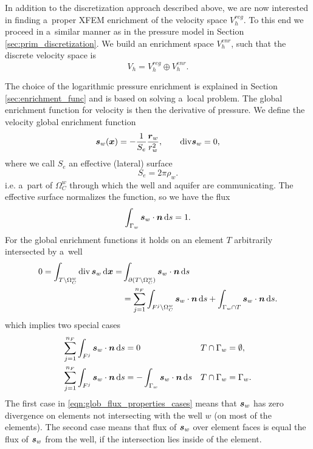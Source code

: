 In addition to the discretization approach described above, we are now interested in finding
a~proper XFEM enrichment of the velocity space $V^{reg}_h$.
To this end we proceed in a~similar manner as in the pressure model in Section \ref{sec:prim_discretization}.
We build an enrichment space $V_h^{enr}$, such that the discrete velocity space is
\begin{equation}
    V_h = V_h^{reg} \oplus V_h^{enr}.
\end{equation}

The choice of the logarithmic pressure enrichment is explained in Section \ref{sec:enrichment_func} and
is based on solving a~local problem. The global enrichment function for velocity is then 
the derivative of pressure. We define the velocity global enrichment function
\begin{equation}
    \mathbf{\boldsymbol{s}}_w(\mathbf{\boldsymbol{x}}) = -\frac{1}{S_e} \frac{\mathbf{\boldsymbol{r}}_w}{r_w^2}, \qquad {\rm div} \mathbf{\boldsymbol{s}}_w = 0 \label{eqn:global_enr_vel},
\end{equation}
where we call $S_e$ an effective (lateral) surface
\begin{equation}
S_e = 2\pi\rho_w.
\end{equation}
i.e. a~part of $\Omega^w_C$ through which the well and aquifer are communicating.
The effective surface normalizes the function, so we have the flux
\begin{equation}
\int_{\Gamma_w} \mathbf{\boldsymbol{s}}_w\cdot \mathbf{\boldsymbol{n}} \,{\rm d} s = 1.
\end{equation}
%
For the global enrichment functions it holds on an element $T$ arbitrarily intersected by a~well
\begin{align}
0 = \int_{T\setminus\Omega^w_C} {\rm div}\,\mathbf{\boldsymbol{s}}_w \,{\rm d}\mathbf{\boldsymbol{x}} = & \int_{\partial (T\setminus\Omega^w_C)} \mathbf{\boldsymbol{s}}_w\cdot\mathbf{\boldsymbol{n}} \,{\rm d} s \nonumber\\
    &= \sum \limits_{j=1}^{n_F} \int_{F^j\setminus \Omega^w_C} \mathbf{\boldsymbol{s}}_w\cdot\mathbf{\boldsymbol{n}} \,{\rm d} s 
      + \int_{\Gamma_w\cap T} \mathbf{\boldsymbol{s}}_w\cdot\mathbf{\boldsymbol{n}} \,{\rm d} s. \label{eqn:glob_flux_properties}
\end{align}
which implies two special cases
\begin{align} \label{eqn:glob_flux_properties_cases}
        \sum \limits_{j=1}^{n_F} \int_{F^j} \mathbf{\boldsymbol{s}}_w\cdot\mathbf{\boldsymbol{n}} \,{\rm d} s &= 0
            && T \cap \Gamma_w=\emptyset, \\
        \sum \limits_{j=1}^{n_F} \int_{F^j} \mathbf{\boldsymbol{s}}_w\cdot\mathbf{\boldsymbol{n}} \,{\rm d} s
            &= - \int_{\Gamma_w} \mathbf{\boldsymbol{s}}_w\cdot\mathbf{\boldsymbol{n}} \,{\rm d} s
            && T \cap \Gamma_w=\Gamma_w.
\end{align}
The first case in \eqref{eqn:glob_flux_properties_cases} means that $\mathbf{\boldsymbol{s}}_w$ has zero divergence on elements
not intersecting with the well $w$ (on most of the elements). The second case means that flux of $\mathbf{\boldsymbol{s}}_w$ over element faces
is equal the flux of $\mathbf{\boldsymbol{s}}_w$ from the well, if the intersection lies inside of the element.

